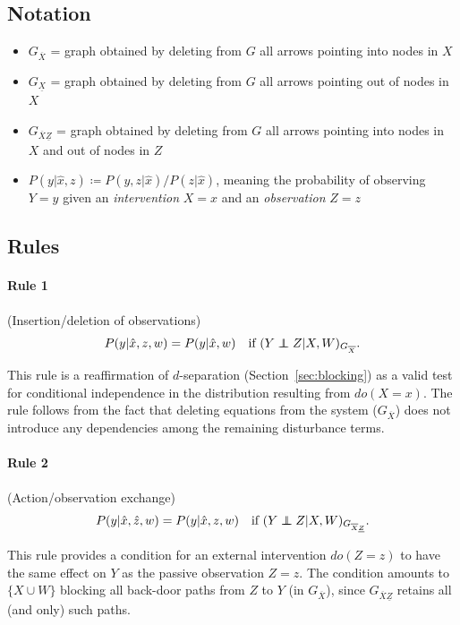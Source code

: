 \documentclass[11pt]{article}
\numberwithin{equation}{section}
\newcommand\indep{\protect\mathpalette{\protect\independenT}{\perp}}
\def\independenT#1#2{\mathrel{\rlap{$#1#2$}\mkern2mu{#1#2}}}
\newcommand{\defeq}{\coloneqq}
\begin{document}
\subsection{Notation}
\begin{itemize}[noitemsep]
\item $G_{\overline{X}}$ = graph obtained by deleting from $G$ all arrows pointing into nodes in $X$
\item $G_{\underline{X}}$ = graph obtained by deleting from $G$ all arrows pointing out of nodes in $X$
\item $G_{\overline{X}\underline{Z}}$ = graph obtained by deleting from $G$ all arrows pointing into nodes in $X$ and out of nodes in $Z$
\item $P(y|\hat{x},z) \defeq P(y,z|\hat{x}) / P(z|\hat{x})$, meaning the probability of observing $Y=y$ given an \textit{intervention} $X=x$ and an \textit{observation} $Z=z$
\end{itemize}

\subsection{Rules} \label{sec:Rules}

\paragraph{Rule 1} (Insertion/deletion of observations)
\begin{equation}
P(y|\hat{x}, z, w) = P(y| \hat{x}, w) \quad \text{if}\ (Y \indep Z|X,W)_{G_{{\overline{X}}}}.
\end{equation}

This rule is a reaffirmation of $d$-separation (Section~\ref{sec:blocking}) as a valid test for conditional independence in the distribution resulting from $do(X=x)$. The rule follows from the fact that deleting equations from the system ($G_{{\overline{X}}}$) does not introduce any dependencies among the remaining disturbance terms.


\paragraph{Rule 2} (Action/observation exchange)
\begin{equation}
P(y|\hat{x},\hat{z},w) = P(y|\hat{x},z,w) \quad \text{if}\ (Y \indep Z|X,W)_{G_{{\overline{X}\underline{Z}}}}.
\end{equation}

This rule provides a condition for an external intervention $do(Z=z)$ to have the same effect on $Y$ as the passive observation $Z=z$. The condition amounts to $\{X \cup W\}$ blocking all back-door paths from $Z$ to $Y$ (in $G_{\overline{X}}$), since $G_{\overline{X}\underline{Z}}$ retains all (and only) such paths.
\end{document}
